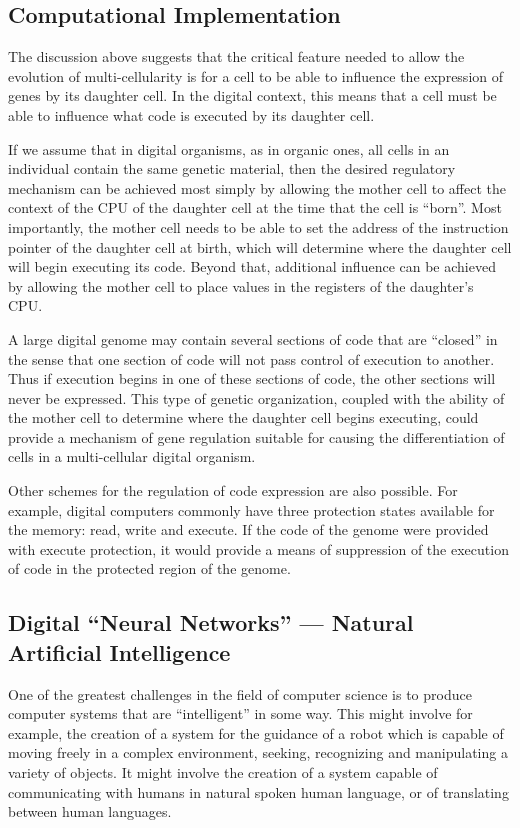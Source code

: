 \subsection{Computational Implementation}

The discussion above suggests that the critical feature needed to allow
the evolution of multi-cellularity is for a cell to be able to influence
the expression of genes by its daughter cell.  In the digital context,
this means that a cell must be able to influence what code is executed
by its daughter cell.

If we assume that in digital organisms, as in organic ones, all cells
in an individual contain the same genetic material, then the desired
regulatory mechanism can be achieved most simply by allowing the mother
cell to affect the context of the CPU of the daughter cell at the time
that the cell is ``born''.  Most importantly, the mother cell needs to
be able to set the address of the instruction pointer of the daughter
cell at birth, which will determine where the daughter cell will begin
executing its code.  Beyond that, additional influence can be achieved
by allowing the mother cell to place values in the registers of the
daughter's CPU.

A large digital genome may contain several sections of code that are
``closed'' in the sense that one section of code will not pass control
of execution to another.  Thus if execution begins in one of these
sections of code, the other sections will never be expressed.  This
type of genetic organization, coupled with the ability of the mother
cell to determine where the daughter cell begins executing, could
provide a mechanism of gene regulation suitable for causing the
differentiation of cells in a multi-cellular digital organism.

Other schemes for the regulation of code expression are also possible.
For example, digital computers commonly have three protection states
available for the memory: read, write and execute.  If the code of
the genome were provided with execute protection, it would provide
a means of suppression of the execution of code in the protected
region of the genome.

\subsection{Digital ``Neural Networks'' --- Natural Artificial Intelligence}

One of the greatest challenges in the field of computer science is to
produce computer systems that are ``intelligent'' in some way.  This
might involve for example, the creation of a system for the guidance
of a robot which is capable of moving freely in a complex environment,
seeking, recognizing and manipulating a variety of objects.  It might
involve the creation of a system capable of communicating with humans
in natural spoken human language, or of translating between human
languages.

